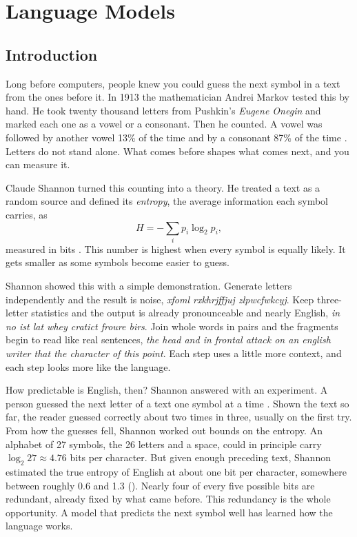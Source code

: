 \chapter{Language Models}
\label{chap:rw-lm}

\section{Introduction}
\label{sec:lm-intro}

Long before computers, people knew you could guess the next
symbol in a text from the ones before it. In 1913 the mathematician Andrei
Markov tested this by hand. He took twenty thousand letters from Pushkin's
\emph{Eugene Onegin} and marked each one as a vowel or a consonant. Then he counted.
A vowel was followed by another vowel 13\% of the time and by a consonant 87\% of the
time \citep{markov_onegin_1913}. Letters do not stand alone. What comes before shapes
what comes next, and you can measure it.

Claude Shannon turned this counting into a theory. He treated a text as a random
source and defined its \emph{entropy}, the average information each symbol carries, as
\[
  H = -\sum_i p_i \log_2 p_i,
\]
measured in bits \citep{shannon_mi}. This number is highest when every symbol
is equally likely. It gets smaller as some symbols become easier to guess.

Shannon showed this with a simple demonstration. Generate letters independently and
the result is noise, \emph{xfoml rxkhrjffjuj zlpwcfwkcyj}. Keep three-letter
statistics and the output is already pronounceable and nearly English, \emph{in no
ist lat whey cratict froure birs}. Join whole words in pairs and the
fragments begin to read like real sentences, \emph{the head and in frontal attack
on an english writer that the character of this point}. Each step uses a little
more context, and each step looks more like the language.

How predictable is English, then? Shannon answered with an experiment. A
person guessed the next letter of a text one symbol at a time
\citep{shannon_prediction_1951}. Shown the text so far, the reader guessed
correctly about two times in three, usually on the first try. From how the guesses
fell, Shannon worked out bounds on the entropy. An alphabet of 27
symbols, the 26 letters and a space, could in principle carry $\log_2 27 \approx
4.76$ bits per character. But
given enough preceding text, Shannon estimated the true entropy of English at
about one bit per character, somewhere between roughly 0.6 and 1.3
(). Nearly four of every five possible bits are redundant,
already fixed by what came before. This redundancy is the whole opportunity. A
model that predicts the next symbol well has learned how the language works.

